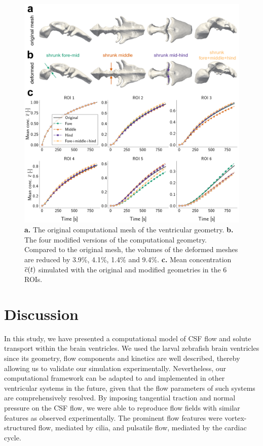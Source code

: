 \documentclass{WileyMSP-template}
\begin{document}
\begin{figure}[H]
    \centering
    \includegraphics[width=\textwidth]{graphics/figure6_compare_modified_geometries.png}
    \caption{\textbf{a.} The original computational mesh of the ventricular geometry.
    \textbf{b.} The four modified versions of the computational geometry. Compared
    to the original mesh, the volumes of the deformed meshes are reduced by 3.9\%, 4.1\%, 1.4\% 
    and 9.4\%.
    \textbf{c.} Mean concentration $\overline{c}(t)$ simulated with the original and modified geometries
    in the 6 ROIs. 
     }
    \label{fig:fig6}
\end{figure}


\section{Discussion}
In this study, we have presented a computational model of CSF flow and solute transport within the brain ventricles.
We used the larval zebrafish brain ventricles since its geometry,
flow components and kinetics are well described, thereby allowing us to validate
our simulation experimentally. Nevertheless, our computational framework can be adapted to and implemented in
other ventricular systems in the future, given that the flow parameters of such systems
are comprehensively resolved. By imposing tangential traction and normal pressure
on the CSF flow, we were able to reproduce flow fields with similar features
as observed experimentally. The prominent flow features were vortex-structured flow,
mediated by cilia, and pulsatile flow, mediated by the cardiac cycle.
\end{document}
